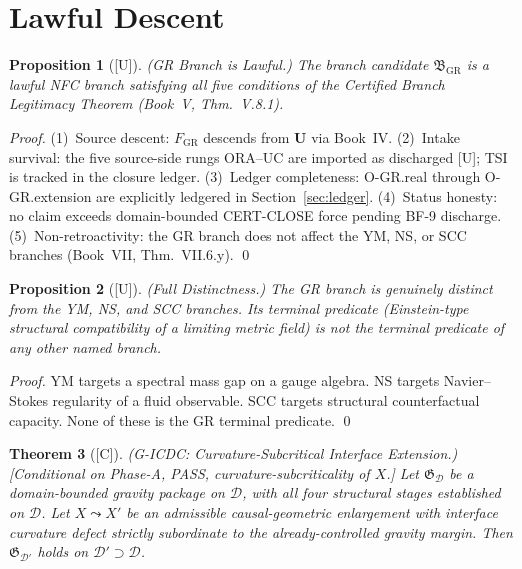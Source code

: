 \documentclass[12pt,oneside]{amsbook}
\theoremstyle{plain}
\newtheorem{theorem}{Theorem}[section]
\newtheorem{proposition}[theorem]{Proposition}
\theoremstyle{definition}
\theoremstyle{remark}
\newcommand{\status}[1]{\textup{[#1]}}
\begin{document}
\section{Lawful Descent}
\label{sec:descent}

\begin{proposition}[\status{U}]\label{prop:gr-lawful}
\textup{(GR Branch is Lawful.)} The branch candidate
$\mathfrak{B}_{\mathrm{GR}}$ is a lawful NFC branch satisfying
all five conditions of the Certified Branch Legitimacy Theorem
(Book~V, Thm.~V.8.1).
\end{proposition}

\begin{proof}
(1)~Source descent: $F_{\mathrm{GR}}$ descends from $\mathbf{U}$
via Book~IV. (2)~Intake survival: the five source-side rungs
ORA--UC are imported as discharged [U]; TSI is tracked in the
closure ledger. (3)~Ledger completeness: O-GR.real through
O-GR.extension are explicitly ledgered in
Section~\ref{sec:ledger}. (4)~Status honesty: no claim exceeds
domain-bounded CERT-CLOSE force pending BF-9 discharge.
(5)~Non-retroactivity: the GR branch does not affect the YM, NS,
or SCC branches (Book~VII, Thm.~VII.6.y).
\qed
\end{proof}

\begin{proposition}[\status{U}]\label{prop:gr-distinct}
\textup{(Full Distinctness.)} The GR branch is genuinely distinct
from the YM, NS, and SCC branches. Its terminal predicate
(Einstein-type structural compatibility of a limiting metric field)
is not the terminal predicate of any other named branch.
\end{proposition}

\begin{proof}
YM targets a spectral mass gap on a gauge algebra. NS targets
Navier--Stokes regularity of a fluid observable. SCC targets
structural counterfactual capacity. None of these is the GR
terminal predicate.
\qed
\end{proof}

\begin{theorem}[\status{C}]\label{thm:gr-icdc}
\textup{(G-ICDC: Curvature-Subcritical Interface Extension.)}
\textup{[Conditional on Phase-A, PASS, curvature-subcriticality
of $X$.]}
Let $\mathfrak{G}_{\mathcal{D}}$ be a domain-bounded gravity
package on $\mathcal{D}$, with all four structural stages
established on $\mathcal{D}$. Let $X \leadsto X'$ be an
admissible causal-geometric enlargement with interface curvature
defect strictly subordinate to the already-controlled gravity
margin. Then $\mathfrak{G}_{\mathcal{D}'}$ holds on
$\mathcal{D}' \supset \mathcal{D}$.
\end{theorem}
\end{document}
